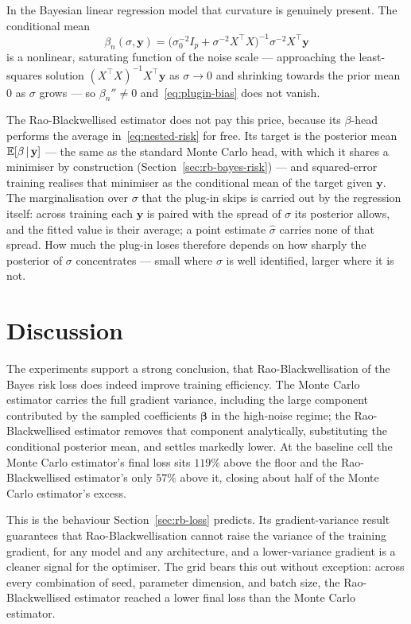 In the Bayesian linear regression model that curvature is genuinely present. The conditional mean
\begin{equation*}
  \beta_n(\sigma, \mathbf{y})
  = \big(\sigma_0^{-2} I_p + \sigma^{-2} X^\top X\big)^{-1}
    \sigma^{-2} X^\top \mathbf{y}
\end{equation*}
is a nonlinear, saturating function of the noise scale --- approaching the
least-squares solution $(X^\top X)^{-1} X^\top \mathbf{y}$ as $\sigma \to 0$ and
shrinking towards the prior mean $0$ as $\sigma$ grows --- so
$\beta_n'' \neq 0$ and~\eqref{eq:plugin-bias} does not vanish.

The Rao-Blackwellised estimator does not pay this price, because its
$\beta$-head performs the average in~\eqref{eq:nested-risk} for free. Its
target is the posterior mean $\mathbb{E}[\beta \,|\, \mathbf{y}]$ --- the same as the
standard Monte Carlo head, with which it shares a minimiser by construction
(Section~\ref{sec:rb-bayes-risk}) --- and squared-error training realises that
minimiser as the conditional mean of the target given $\mathbf{y}$. The
marginalisation over $\sigma$ that the plug-in skips is carried out by the
regression itself: across training each $\mathbf{y}$ is paired with the spread of
$\sigma$ its posterior allows, and the fitted value is their average; a point
estimate $\hat\sigma$ carries none of that spread. How much the plug-in loses
therefore depends on how sharply the posterior of $\sigma$ concentrates --- small
where $\sigma$ is well identified, larger where it is not.


\section{Discussion}
\label{sec:lr-discussion}

The experiments support a strong conclusion, that Rao-Blackwellisation of the 
Bayes risk loss does indeed improve training efficiency. The Monte Carlo estimator carries the full gradient
variance, including the large component contributed by the sampled
coefficients $\bm{\beta}$ in the high-noise regime; the
Rao-Blackwellised estimator removes that component analytically,
substituting the conditional posterior mean, and settles markedly
lower. At the baseline cell the Monte Carlo estimator's final loss
sits $119\%$ above the floor and the Rao-Blackwellised estimator's only
$57\%$ above it, closing about half of the Monte Carlo estimator's
excess.

This is the behaviour Section~\ref{sec:rb-loss} predicts. Its gradient-variance result
guarantees that Rao-Blackwellisation cannot raise the variance of the
training gradient, for any model and any architecture, and a
lower-variance gradient is a cleaner signal for the optimiser. The
grid bears this out without exception: across every combination of
seed, parameter dimension, and batch size, the Rao-Blackwellised
estimator reached a lower final loss than the Monte Carlo estimator.

